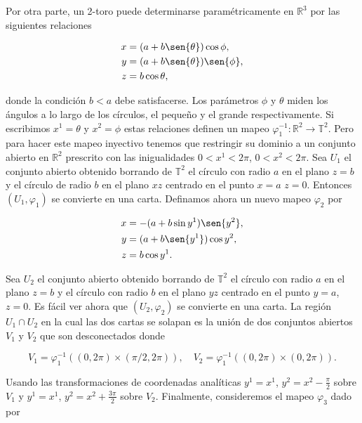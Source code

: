 \documentclass[a4paper,10pt]{article}
\numberwithin{equation}{section}
\begin{document}
\vspace{.3cm}

Por otra parte, un 2-toro puede determinarse paramétricamente en $\mathbb{R}^3$ por 
las siguientes relaciones 

\begin{align}
 x &= (a+b\sen{\theta})\cos{\phi}, \\
 y &= (a+b\sen{\theta})\sen{\phi}, \\
 z &= b\cos{\theta},
\end{align}

donde la condición $b<a$ debe satisfacerse. Los parámetros $\phi$ y $\theta$ miden 
los ángulos a lo largo de los círculos, el pequeño y el grande respectivamente. Si 
escribimos $x^1 = \theta$ y $x^2 = \phi$ estas relaciones definen un mapeo $\varphi_1^{-1}:
\mathbb{R}^2\rightarrow \mathbb{T}^2$. Pero para hacer este mapeo inyectivo tenemos 
que restringir su dominio a un conjunto abierto en $\mathbb{R}^2$ prescrito con 
las inigualidades $0 < x^1 < 2\pi$, $0 < x^2 < 2\pi$. Sea $U_1$ el conjunto abierto
obtenido borrando de $\mathbb{T}^2$ el círculo con radio $a$ en el plano $z=b$ y 
el círculo de radio $b$ en el plano $xz$ centrado en el punto $x=a$ $z=0$. Entonces 
$(U_1,\varphi_1)$ se convierte en una carta. Definamos ahora un nuevo mapeo $\varphi_2$ 
por 

\begin{align}
 x &= -(a + b\sin{y^1})\sen{y^2}, \\
 y &= (a + b\sen{y^1})\cos{y^2}, \\
 z &= b \cos{y^1}.
\end{align}

Sea $U_2$ el conjunto abierto obtenido borrando de $\mathbb{T}^2$ el círculo con 
radio $a$ en el plano $z=b$ y el círculo con radio $b$ en el plano $yz$ centrado 
en el punto $y=a$, $z=0$. Es fácil ver ahora que $(U_2,\varphi_2)$ se convierte en una 
carta. La región $U_1 \cap U_2$ en la cual las dos cartas se solapan es la unión 
de dos conjuntos abiertos $V_1$ y $V_2$ que son desconectados donde 

\begin{equation}
 V_1 = \varphi_1^{-1}((0,2\pi) \times (\pi/2,2\pi)), \quad 
 V_2 =  \varphi_1^{-1}((0,2\pi) \times (0,2\pi)).
\end{equation}


Usando las transformaciones de coordenadas analíticas $y^1 = x^1$, $y^2 = x^2 - \frac{\pi}{2}$ 
sobre $V_1$ y $y^1 = x^1$, $y^2 = x^2 + \frac{3\pi}{2}$ sobre $V_2$. Finalmente, 
consideremos el mapeo $\varphi_3$ dado por 
\end{document}
